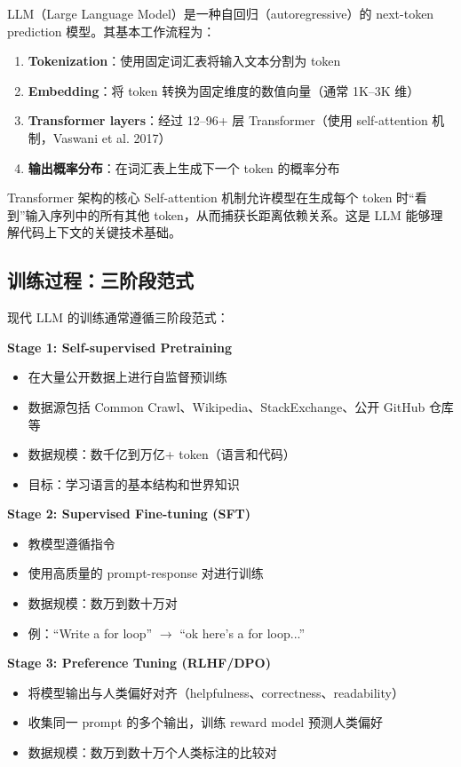 \documentclass[a4paper]{article}
\begin{document}
LLM（Large Language Model）是一种自回归（autoregressive）的 next-token prediction 模型。其基本工作流程为：

\begin{enumerate}
    \item \textbf{Tokenization}：使用固定词汇表将输入文本分割为 token
    \item \textbf{Embedding}：将 token 转换为固定维度的数值向量（通常 1K--3K 维）
    \item \textbf{Transformer layers}：经过 12--96+ 层 Transformer（使用 self-attention 机制，Vaswani et al. 2017）
    \item \textbf{输出概率分布}：在词汇表上生成下一个 token 的概率分布
\end{enumerate}

\begin{knowledgebox}{Transformer 架构的核心}
Self-attention 机制允许模型在生成每个 token 时``看到''输入序列中的所有其他 token，从而捕获长距离依赖关系。这是 LLM 能够理解代码上下文的关键技术基础。
\end{knowledgebox}

\subsection{训练过程：三阶段范式}

现代 LLM 的训练通常遵循三阶段范式：

\textbf{Stage 1: Self-supervised Pretraining}
\begin{itemize}
    \item 在大量公开数据上进行自监督预训练
    \item 数据源包括 Common Crawl、Wikipedia、StackExchange、公开 GitHub 仓库等
    \item 数据规模：数千亿到万亿+ token（语言和代码）
    \item 目标：学习语言的基本结构和世界知识
\end{itemize}

\textbf{Stage 2: Supervised Fine-tuning (SFT)}
\begin{itemize}
    \item 教模型遵循指令
    \item 使用高质量的 prompt-response 对进行训练
    \item 数据规模：数万到数十万对
    \item 例：``Write a for loop'' $\rightarrow$ ``ok here's a for loop...''
\end{itemize}

\textbf{Stage 3: Preference Tuning (RLHF/DPO)}
\begin{itemize}
    \item 将模型输出与人类偏好对齐（helpfulness、correctness、readability）
    \item 收集同一 prompt 的多个输出，训练 reward model 预测人类偏好
    \item 数据规模：数万到数十万个人类标注的比较对
\end{itemize}
\end{document}
